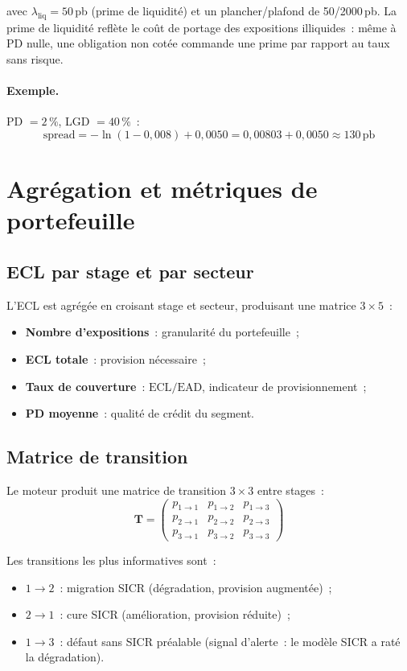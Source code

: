 \documentclass[12pt, a4paper, twoside, openright]{report}
\theoremstyle{definition}
\begin{document}
\noindent avec $\lambda_{\text{liq}} = 50$\,pb (prime de liquidité) et un plancher/plafond de 50/2000\,pb. La prime de liquidité reflète le coût de portage des expositions illiquides~: même à PD nulle, une obligation non cotée commande une prime par rapport au taux sans risque.

\paragraph{Exemple.} PD $= 2\,\%$, LGD $= 40\,\%$~:
$$\text{spread} = -\ln(1 - 0{,}008) + 0{,}0050 = 0{,}00803 + 0{,}0050 \approx 130\,\text{pb}$$

\section{Agrégation et métriques de portefeuille}
\label{sec:ecl:agregation}

\subsection{ECL par stage et par secteur}

L'ECL est agrégée en croisant stage et secteur, produisant une matrice $3 \times 5$~:
\begin{itemize}[nosep]
  \item \textbf{Nombre d'expositions}~: granularité du portefeuille~;
  \item \textbf{ECL totale}~: provision nécessaire~;
  \item \textbf{Taux de couverture}~: $\text{ECL} / \text{EAD}$, indicateur de provisionnement~;
  \item \textbf{PD moyenne}~: qualité de crédit du segment.
\end{itemize}

\subsection{Matrice de transition}

Le moteur produit une matrice de transition $3 \times 3$ entre stages~:
$$\mathbf{T} = \begin{pmatrix}
p_{1 \to 1} & p_{1 \to 2} & p_{1 \to 3} \\
p_{2 \to 1} & p_{2 \to 2} & p_{2 \to 3} \\
p_{3 \to 1} & p_{3 \to 2} & p_{3 \to 3}
\end{pmatrix}$$

\noindent Les transitions les plus informatives sont~:
\begin{itemize}[nosep]
  \item $1 \to 2$~: migration SICR (dégradation, provision augmentée)~;
  \item $2 \to 1$~: cure SICR (amélioration, provision réduite)~;
  \item $1 \to 3$~: défaut sans SICR préalable (signal d'alerte~: le modèle SICR a raté la dégradation).
\end{itemize}
\end{document}
